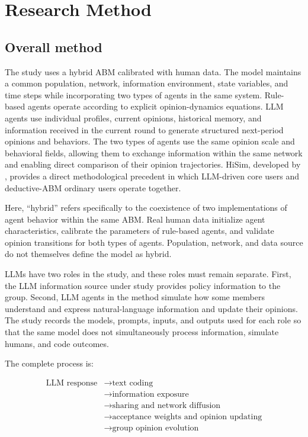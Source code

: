 \documentclass[11pt,a4paper]{article}
\begin{document}
\clearpage
\section{Research Method}

\subsection{Overall method}

The study uses a hybrid ABM calibrated with human data. The model maintains a common population, network, information environment, state variables, and time steps while incorporating two types of agents in the same system. Rule-based agents operate according to explicit opinion-dynamics equations. LLM agents use individual profiles, current opinions, historical memory, and information received in the current round to generate structured next-period opinions and behaviors. The two types of agents use the same opinion scale and behavioral fields, allowing them to exchange information within the same network and enabling direct comparison of their opinion trajectories. HiSim, developed by \citet{mou2024}, provides a direct methodological precedent in which LLM-driven core users and deductive-ABM ordinary users operate together.

Here, ``hybrid'' refers specifically to the coexistence of two implementations of agent behavior within the same ABM. Real human data initialize agent characteristics, calibrate the parameters of rule-based agents, and validate opinion transitions for both types of agents. Population, network, and data source do not themselves define the model as hybrid.

LLMs have two roles in the study, and these roles must remain separate. First, the LLM information source under study provides policy information to the group. Second, LLM agents in the method simulate how some members understand and express natural-language information and update their opinions. The study records the models, prompts, inputs, and outputs used for each role so that the same model does not simultaneously process information, simulate humans, and code outcomes.

The complete process is:

\begin{equation*}
\begin{aligned}\text{LLM response} &\rightarrow \text{text coding} \\
&\rightarrow \text{information exposure} \\
&\rightarrow \text{sharing and network diffusion} \\
&\rightarrow \text{acceptance weights and opinion updating} \\
&\rightarrow \text{group opinion evolution}\end{aligned}
\end{equation*}
\end{document}
